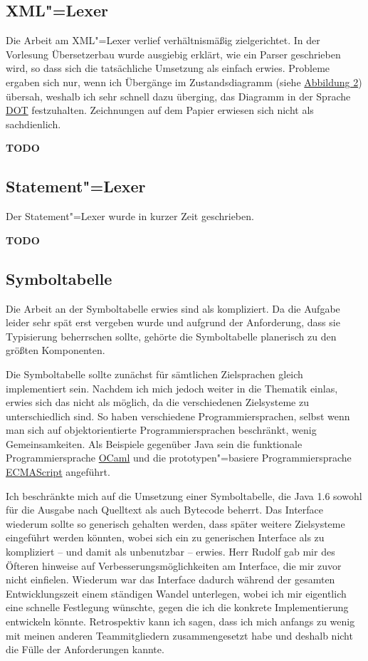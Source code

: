 \documentclass[10pt,a4paper,ngerman,titlepage,tocindentauto]{scrartcl}
\newcommand{\TODO}{ {\LARGE\bf\color{crimson} TODO} }
\begin{document}
		\subsection{XML"=Lexer}
			Die Arbeit am XML"=Lexer verlief verhältnismäßig zielgerichtet. In der Vorlesung
			Übersetzerbau wurde ausgiebig erklärt, wie ein Parser geschrieben wird, so dass
			sich die tatsächliche Umsetzung als einfach erwies. Probleme ergaben sich nur,
			wenn ich Übergänge im Zustandsdiagramm (siehe \hyperlink{Uebergangsdiagramm_XML_Lexer}{Abbildung 2})
			übersah, weshalb ich sehr schnell dazu überging, das Diagramm in der Sprache
			\href{http://www.graphviz.org/doc/info/lang.html}{DOT} festzuhalten. Zeichnungen auf
			dem Papier erwiesen sich nicht als sachdienlich.
		
			\TODO
		
		\subsection{Statement"=Lexer}
			Der Statement"=Lexer wurde in kurzer Zeit geschrieben.
			
			\TODO
		
		\subsection{Symboltabelle}
			Die Arbeit an der Symboltabelle erwies sind als kompliziert. Da die Aufgabe leider sehr spät erst
			vergeben wurde und aufgrund der Anforderung, dass sie Typisierung beherrschen sollte, gehörte
			die Symboltabelle planerisch zu den größten Komponenten.
			
			
			Die Symboltabelle sollte zunächst für sämtlichen Zielsprachen gleich implementiert sein. Nachdem
			ich mich jedoch weiter in die Thematik einlas, erwies sich das nicht als möglich, da die verschiedenen
			Zielsysteme zu unterschiedlich sind. So haben verschiedene Programmiersprachen, selbst wenn man
			sich auf objektorientierte Programmiersprachen beschränkt, wenig Gemeinsamkeiten. Als Beispiele gegenüber
			Java sein die funktionale Programmiersprache \href{http://caml.inria.fr/ocaml/}{OCaml} und die prototypen"=basiere
			Programmiersprache \href{http://www.ecma-international.org/publications/standards/Ecma-262.htm}{ECMAScript}
			angeführt.
			
			Ich beschränkte mich auf die Umsetzung einer Symboltabelle, die Java 1.6 sowohl für die Ausgabe
			nach Quelltext als auch Bytecode beherrt. Das Interface wiederum sollte so generisch gehalten werden,
			dass später weitere Zielsysteme eingeführt werden könnten, wobei sich ein zu generischen Interface
			als zu kompliziert -- und damit als unbenutzbar -- erwies. Herr Rudolf gab mir des Öfteren hinweise
			auf Verbesserungsmöglichkeiten am Interface, die mir zuvor nicht einfielen. Wiederum war das Interface
			dadurch während der gesamten Entwicklungszeit einem ständigen Wandel unterlegen, wobei ich mir eigentlich
			eine schnelle Festlegung wünschte, gegen die ich die konkrete Implementierung entwickeln könnte.
			Retrospektiv kann ich sagen, dass ich mich anfangs zu wenig mit meinen anderen Teammitgliedern
			zusammengesetzt habe und deshalb nicht die Fülle der Anforderungen kannte.
			
\end{document}
